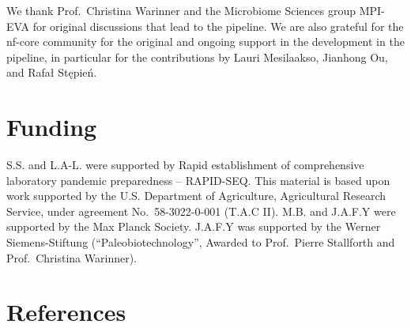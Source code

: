 \documentclass[
]{article}
\begin{document}
We thank Prof.~Christina Warinner and the Microbiome Sciences group
MPI-EVA for original discussions that lead to the pipeline. We are also
grateful for the nf-core community for the original and ongoing support
in the development in the pipeline, in particular for the contributions
by Lauri Mesilaakso, Jianhong Ou, and Rafał Stępień.

\hypertarget{funding}{%
\section{Funding}\label{funding}}

S.S. and L.A-L. were supported by Rapid establishment of comprehensive
laboratory pandemic preparedness -- RAPID-SEQ. This material is based
upon work supported by the U.S. Department of Agriculture, Agricultural
Research Service, under agreement No.~58-3022-0-001 (T.A.C II). M.B. and
J.A.F.Y were supported by the Max Planck Society. J.A.F.Y was supported
by the Werner Siemens-Stiftung (``Paleobiotechnology'', Awarded to
Prof.~Pierre Stallforth and Prof.~Christina Warinner).

\hypertarget{references}{%
\section*{References}\label{references}}
\end{document}
